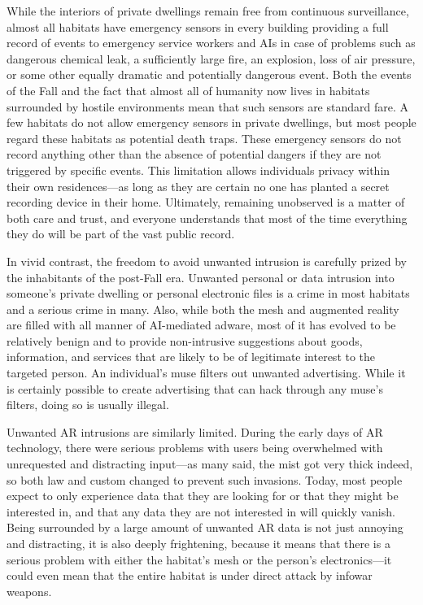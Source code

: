 While the interiors of private dwellings remain free from continuous surveillance, almost all habitats have emergency sensors in every building providing a full record of events to emergency service workers and AIs in case of problems such as dangerous chemical leak, a sufficiently large fire, an explosion, loss of air pressure, or some other equally dramatic and potentially dangerous event. Both the events of the Fall and the fact that almost all of humanity now lives in habitats surrounded by hostile environments mean that such sensors are standard fare. A few habitats do not allow emergency sensors in private dwellings, but most people regard these habitats as potential death traps. These emergency sensors do not record anything other than the absence of potential dangers if they are not triggered by specific events. This limitation allows individuals privacy within their own residences—as long as they are certain no one has planted a secret recording device in their home. Ultimately, remaining unobserved is a matter of both care and trust, and everyone understands that most of the time everything they do will be part of the vast public record. 

In vivid contrast, the freedom to avoid unwanted intrusion is carefully prized by the inhabitants of the post-Fall era. Unwanted personal or data intrusion into someone's private dwelling or personal electronic files is a crime in most habitats and a serious crime in many. Also, while both the mesh and augmented reality are filled with all manner of AI-mediated adware, most of it has evolved to be relatively benign and to provide non-intrusive suggestions about goods, information, and services that are likely to be of legitimate interest to the targeted person. An individual's muse filters out unwanted advertising. While it is certainly possible to create advertising that can hack through any muse's filters, doing so is usually illegal. 

Unwanted AR intrusions are similarly limited. During the early days of AR technology, there were serious problems with users being overwhelmed with unrequested and distracting input—as many said, the mist got very thick indeed, so both law and custom changed to prevent such invasions. Today, most people expect to only experience data that they are looking for or that they might be interested in, and that any data they are not interested in will quickly vanish. Being surrounded by a large amount of unwanted AR data is not just annoying and distracting, it is also deeply frightening, because it means that there is a serious problem with either the habitat's mesh or the person's electronics—it could even mean that the entire habitat is under direct attack by infowar weapons. 

